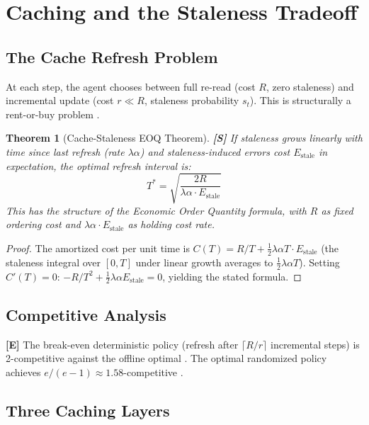 \documentclass[11pt, a4paper, copyright]{googledeepmind}
\newtheorem{theorem}{Theorem}[section]
\begin{document}
\section{Caching and the Staleness Tradeoff}\label{sec:caching}

\subsection{The Cache Refresh Problem}

At each step, the agent chooses between full re-read (cost $R$, zero staleness) and incremental update (cost $r \ll R$, staleness probability $s_t$). This is structurally a rent-or-buy problem \citep{sleator1985amortized}.

\begin{theorem}[Cache-Staleness EOQ Theorem]\label{thm:cache-eoq}
\textbf{[S]} If staleness grows linearly with time since last refresh (rate $\lambda\alpha$) and staleness-induced errors cost $E_{\mathrm{stale}}$ in expectation, the optimal refresh interval is:
\[
    T^* = \sqrt{\frac{2R}{\lambda\alpha \cdot E_{\mathrm{stale}}}}
\]
This has the structure of the Economic Order Quantity formula, with $R$ as fixed ordering cost and $\lambda\alpha \cdot E_{\mathrm{stale}}$ as holding cost rate.
\end{theorem}

\begin{proof}
The amortized cost per unit time is $C(T) = R/T + \frac{1}{2}\lambda\alpha T \cdot E_{\mathrm{stale}}$ (the staleness integral over $[0, T]$ under linear growth averages to $\frac{1}{2}\lambda\alpha T$). Setting $C'(T) = 0$: $-R/T^2 + \frac{1}{2}\lambda\alpha E_{\mathrm{stale}} = 0$, yielding the stated formula.
\end{proof}

\subsection{Competitive Analysis}

\textbf{[E]} The break-even deterministic policy (refresh after $\lceil R/r \rceil$ incremental steps) is 2-competitive against the offline optimal \citep{sleator1985amortized}. The optimal randomized policy achieves $e/(e-1) \approx 1.58$-competitive \citep{fiat1991competitive}.

\subsection{Three Caching Layers}
\end{document}
